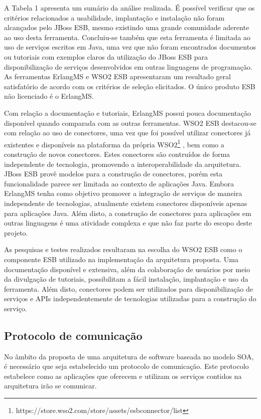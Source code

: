 A Tabela 1 apresenta um sumário da análise realizada. É possível verificar que os critérios relacionados a usabilidade, implantação e instalação não foram alcançados pelo JBoss ESB, mesmo existindo uma grande comunidade aderente ao uso desta ferramenta. Concluiu-se também que esta ferramenta é limitada ao uso de serviços escritos em Java, uma vez que não foram encontrados documentos ou tutoriais com exemplos claros da utilização do JBoss ESB para disponibilização de serviços desenvolvidos em outras linguagens  de programação. As ferramentas ErlangMS e WSO2 ESB apresentaram um resultado geral satisfatório de acordo com os critérios de seleção elicitados. O único produto ESB não licenciado é o ErlangMS.

Com relação a documentação e tutoriais, ErlangMS possui pouca documentação disponível quando comparada com as outras ferramentas. WSO2 ESB destacou-se com relação ao uso de conectores, uma vez que foi possível utilizar conectores já existentes e disponíveis na plataforma da própria WSO2\footnote{https://store.wso2.com/store/assets/esbconnector/list} , bem como a construção de novos conectores. Estes conectores são contruídos de forma independente de tecnologia, promovendo a interoperabilidade da arquitetura. JBoss ESB provê modelos para a construção de conectores, porém esta funcionalidade parece ser limitada ao contexto de aplicações Java. Embora ErlangMS tenha como objetivo promover a integração de serviços de maneira independente de tecnologias, atualmente existem conectores disponíveis apenas para aplicações Java. Além disto, a construção de conectores para aplicações em outras linguagens é uma atividade complexa e que  não faz parte do escopo deste projeto.

As pesquisas e testes realizados resultaram na escolha do WSO2 ESB como o componente ESB utilizado na implementação da arquitetura proposta. Uma documentação disponível e extensiva, além da colaboração de usuários por meio da divulgação de tutoriais, possibilitam a fácil instalação, implantação e uso da ferramenta. Além disto, conectores podem ser utilizados para disponibilização de serviços e APIs independentemente de tecnologias utilizadas para a construção do serviço. 

\subsection{Protocolo de comunicação}

No âmbito da proposta de uma arquitetura de software baseada no modelo SOA, é necessário que seja estabelecido um protocolo de comunicação. Este protocolo estabelece como as aplicações que oferecem e utilizam os serviços contidos na arquitetura irão se comunicar.

